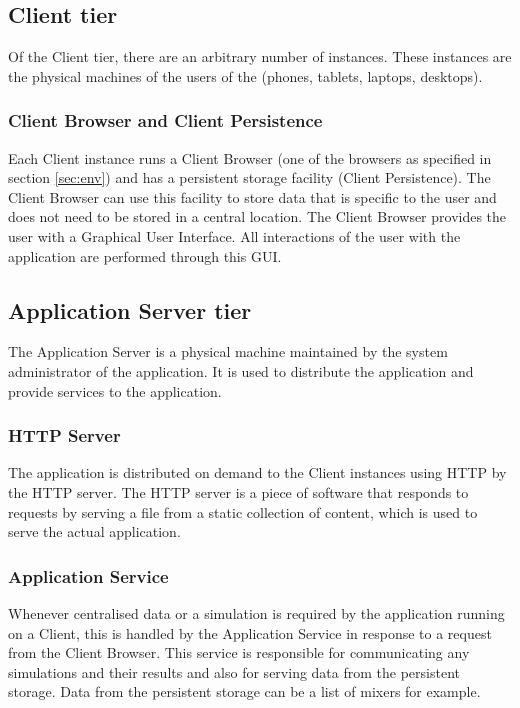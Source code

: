 \subsection{Client tier}
\label{sec:clienttier}
Of the Client tier, there are an arbitrary number of instances. These instances are the physical machines of the users of the \applicationname{} (phones, tablets, laptops, desktops).

\subsubsection{Client Browser and Client Persistence}
\label{sec:clientbrowser} 
Each Client instance runs a Client Browser (one of the browsers as specified in section \ref{sec:env}) and has a persistent storage facility (Client Persistence). The Client Browser can use this facility to store data that is specific to the user and does not need to be stored in a central location. The Client Browser provides the user with a Graphical User Interface. All interactions of the user with the application are performed through this GUI.

\subsection{Application Server tier}
\label{sec:aplicationserver}
The Application Server is a physical machine maintained by the system administrator of the application. It is used to distribute the application and provide services to the application.

\subsubsection{HTTP Server}
\label{sec:httpserver}
The application is distributed on demand to the Client instances using HTTP by the HTTP server. The HTTP server is a piece of software that responds to requests by serving a file from a static collection of content, which is used to serve the actual application.

\subsubsection{Application Service}
\label{sec:applicationservice}
Whenever centralised data or a simulation is required by the application running on a Client, this is handled by the Application Service in response to a request from the Client Browser. This service is responsible for communicating any simulations and their results and also for serving data from the persistent storage. Data from the persistent storage can be a list of mixers for example.

